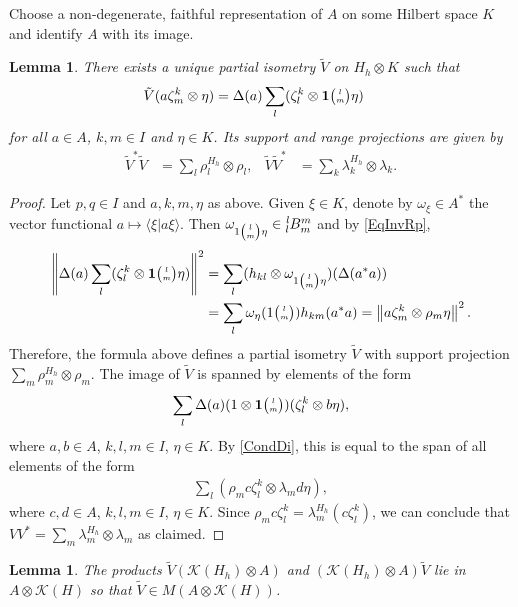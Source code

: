 \documentclass[11pt]{article}
\newcommand{\Grt}[3]{#1{\tiny {\begin{pmatrix} #2\\#3\end{pmatrix}}}}
\newcommand{\UnitC}[2]{\Grt{\mathbf{1}}{#1}{#2}}
\newcommand{\Grru}[2]{{\tiny \begin{pmatrix} #1 \\ #2\end{pmatrix}}}
\newcommand{\Gr}[5]{\tensor*[^{#2}_{#4}]{#1}{^{#3}_{#5}}}%
\newtheorem{Lem}[Theorem]{Lemma}
\theoremstyle{definition}
\numberwithin{equation}{section}
\begin{document}
 Choose a non-degenerate, faithful representation of $A$ on some Hilbert space $K$ and identify $A$
 with its image.
 \begin{Lem}\label{lem:reg-corep-pi}
   There exists a unique partial isometry $\tilde V$ on $H_{h} \otimes
   K$ such
   that
   \begin{align*}
     \tilde V(a \zeta^k_m \otimes \eta) &=
     \Delta(a) \sum_{l}(\zeta^{k}_{l} \otimes \UnitC{l}{m}\eta)
   \end{align*}
   for all $a\in A$, $k,m\in I$ and $\eta\in K$. Its support and range
   projections are given by
   \begin{align*}
     \tilde V^{*}\tilde V &= \sum_{l} \rho^{H_{h}}_{l} \otimes \rho_{l}, &
     \tilde V \tilde V^{*} &= \sum_{k} \lambda^{H_{h}}_{k} \otimes \lambda_{k}.
   \end{align*}
 \end{Lem}
 \begin{proof}
   Let $p,q\in I$ and $a,k,m,\eta$ as above. Given $\xi \in K$, denote by $\omega_{\xi}\in A^{*}$ the vector
   functional $a \mapsto \langle \xi|a\xi\rangle$.
   Then $\omega_{1\Grru{l}{m}\eta} \in \Gr{B}{l}{m}{l}{m}$ and by \eqref{EqInvRp},
   \begin{align*}
  \left\|\Delta(a)\sum_{l}(\zeta^{k}_{l}\otimes \UnitC{l}{m}\eta)\right\|^{2} &= \sum_{l} (h_{kl}
  \otimes \omega_{1\Grru{l}{m}\eta})(\Delta(a^{*}a)) \\
  &= \sum_{l}\omega_{\eta}(1\Grru{l}{m}) h_{km}(a^{*}a) 
  = \left\|a\zeta^{k}_{m} \otimes  \rho_{m}\eta \right\|^{2}.
\end{align*}
Therefore, the formula above defines a partial isometry $\tilde V$ with support projection $\sum_{m}
\rho^{H_{h}}_{m} \otimes \rho_{m}$. The image of $\tilde V$ is spanned by elements of the form
\begin{align*}
\sum_{l}   \Delta(a)(1 \otimes \UnitC{l}{m}) (\zeta^{k}_{l} \otimes b\eta),
\end{align*}
where $a,b\in A$, $k,l,m\in I$, $\eta\in K$. By  \eqref{CondDi}, this is equal to the span of all
elements of the form
\begin{align*}
  \sum_{l} (\rho_{m}c \zeta^{k}_{l} \otimes \lambda_{m}d\eta),
\end{align*}
where $c,d\in A$, $k,l,m \in I$, $\eta\in K$. Since $\rho_{m}c\zeta^{k}_{l} =
\lambda^{H_{h}}_{m}(c\zeta^{k}_{l})$, we can conclude that $VV^{*}=\sum_{m} \lambda^{H_{h}}_{m}
\otimes \lambda_{m}$ as claimed.
 \end{proof}
 \begin{Lem}\label{lem:reg-corep-mult}
   The products $ \tilde V(\mathcal{K}(H_{h})\otimes A)$ and 
   $(\mathcal{K}(H_{h}) \otimes A)\tilde V$ lie in $A \otimes
   \mathcal{K}(H)$ so that $\tilde V \in M(A\otimes \mathcal{K}(H))$.
 \end{Lem}
\end{document}
